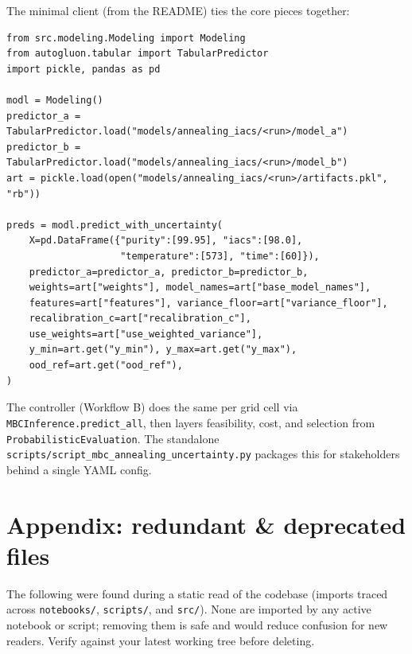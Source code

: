 \documentclass[11pt,a4paper]{article}
\newcommand{\code}[1]{\texttt{\small #1}}
\newcommand{\file}[1]{\texttt{\small #1}}
\begin{document}
The minimal client (from the README) ties the core pieces together:

\begin{lstlisting}
from src.modeling.Modeling import Modeling
from autogluon.tabular import TabularPredictor
import pickle, pandas as pd

modl = Modeling()
predictor_a = TabularPredictor.load("models/annealing_iacs/<run>/model_a")
predictor_b = TabularPredictor.load("models/annealing_iacs/<run>/model_b")
art = pickle.load(open("models/annealing_iacs/<run>/artifacts.pkl", "rb"))

preds = modl.predict_with_uncertainty(
    X=pd.DataFrame({"purity":[99.95], "iacs":[98.0],
                    "temperature":[573], "time":[60]}),
    predictor_a=predictor_a, predictor_b=predictor_b,
    weights=art["weights"], model_names=art["base_model_names"],
    features=art["features"], variance_floor=art["variance_floor"],
    recalibration_c=art["recalibration_c"],
    use_weights=art["use_weighted_variance"],
    y_min=art.get("y_min"), y_max=art.get("y_max"),
    ood_ref=art.get("ood_ref"),
)
\end{lstlisting}

\noindent
The controller (Workflow B) does the same per grid cell via
\code{MBCInference.predict\_all}, then layers feasibility, cost, and selection
from \code{ProbabilisticEvaluation}. The standalone
\file{scripts/script\_mbc\_annealing\_uncertainty.py} packages this for
stakeholders behind a single YAML config.

\appendix
\section{Appendix: redundant \& deprecated files}

The following were found during a static read of the codebase (imports traced
across \file{notebooks/}, \file{scripts/}, and \file{src/}). None are imported by
any active notebook or script; removing them is safe and would reduce confusion
for new readers. Verify against your latest working tree before deleting.
\end{document}
